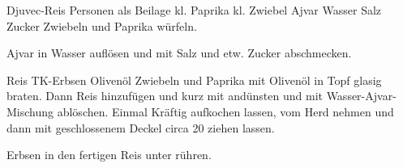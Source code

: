 \begin{MyRecipe}{Djuvec-Reis}{ Personen als Beilage}{}
	\ingredient[\Calc{1}{\x}]{} {kl. Paprika}
	\ingredient[\Calc{1}{\x}]{} {kl. Zwiebel}
	\ingredient[\Calc{50}{\x}]{\si{\gram}} {Ajvar}
	\ingredient[\Calc{0.2}{\x}]{\si{\liter}} {Wasser}
	\ingredient[]{} {Salz}
	\ingredient[]{} {Zucker}
	Zwiebeln und Paprika würfeln.
	
	Ajvar in Wasser auflösen und mit Salz und etw. Zucker abschmecken.
	
	\ingredient[\Calc{100}{\x}]{\si{\gram}} {Reis}
	\ingredient[\Calc{50}{\x}]{\si{\gram}} {TK-Erbsen}
	\ingredient[]{} {Olivenöl}
	Zwiebeln und Paprika mit Olivenöl in Topf glasig braten. Dann Reis hinzufügen und kurz mit andünsten und mit Wasser-Ajvar-Mischung ablöschen. Einmal Kräftig aufkochen lassen, vom Herd nehmen und dann mit geschlossenem Deckel circa \SI{20}{\minuteprime} ziehen lassen.
	
	Erbsen in den fertigen Reis unter rühren.
	

	
	
	
\end{MyRecipe}